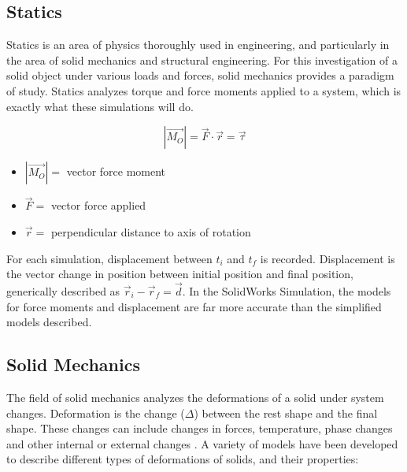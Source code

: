 \documentclass[12pt, letterpaper]{article}
\begin{document}
\subsection{Statics}
\label{sec:statics}

Statics is an area of physics thoroughly used in engineering, and particularly in the area of solid mechanics and structural engineering. For this investigation of a solid object under various loads and forces, solid mechanics provides a paradigm of study. Statics analyzes torque and force moments applied to a system, which is exactly what these simulations will do. 

\begin{singlespace}
\begin{equation}
	\label{eq:force}
	|\vec{M_O}| = \vec{F} \cdot \vec{r} = \vec{\tau}
\end{equation}
\begin{small}
	\begin{itemize}
	\item[] $|\vec{M_O}| =$ vector force moment
	\item[] $\vec{F} =$ vector force applied
	\item[] $\vec{r} =$ perpendicular distance to axis of rotation
	\end{itemize}
\end{small}
\end{singlespace}

For each simulation, displacement  between $t_i$ and $t_f$ is recorded. Displacement is the vector change in position between initial position and final position, generically described as $\vec r_i - \vec r_f = \vec d$. In the SolidWorks Simulation, the models for force moments and displacement are far more accurate than the simplified models described. 

\subsection{Solid Mechanics}
\label{sec:solid-mechanics}

The field of solid mechanics analyzes the deformations of a solid under system changes. Deformation is the change ($\Delta$) between the rest shape and the final shape. These changes can include changes in forces, temperature, phase changes and other internal or external changes \autocite{chou_elasticity:_1992}. A variety of models have been developed to describe different types of deformations of solids, and their properties:
\end{document}
